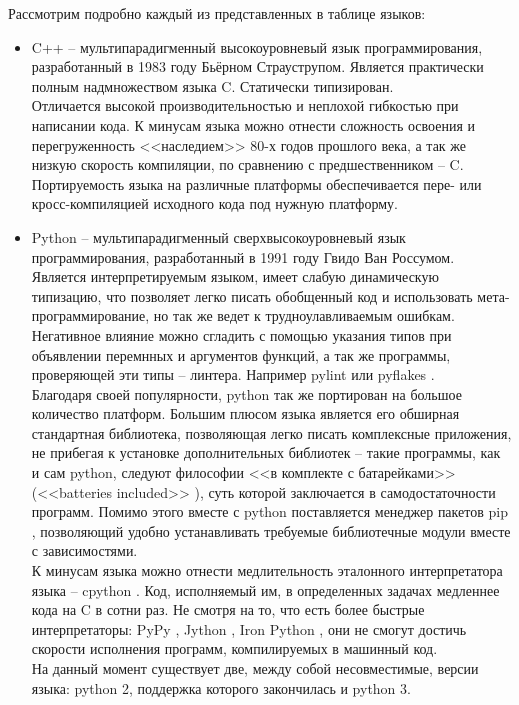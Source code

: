 Рассмотрим подробно каждый из представленных в таблице языков:
\begin{itemize}
    \item C++ -- мультипарадигменный высокоуровневый язык программирования,
        разработанный в 1983 году Бьёрном Страуструпом. Является практически
        полным надмножеством языка C. Статически типизирован.\\
        Отличается высокой производительностью и неплохой гибкостью при написании кода.
        К минусам языка можно отнести сложность освоения и перегруженность 
        <<наследием>> 80-х годов прошлого века, а так же низкую скорость компиляции,
        по сравнению с предшественником -- C.\\
        Портируемость языка на различные платформы обеспечивается пере- или
        кросс-компиляцией исходного кода под нужную платформу.
        

    \item Python \autocite{python} -- мультипарадигменный сверхвысокоуровневый 
        язык программирования, разработанный в 1991 году Гвидо Ван Россумом.
        Является интерпретируемым языком, имеет слабую динамическую типизацию,
        что позволяет легко писать обобщенный код и использовать мета-программирование,
        но так же ведет к трудноулавливаемым ошибкам. Негативное влияние можно сгладить
        с помощью указания типов при объявлении перемнных и аргументов функций, а так же 
        программы, проверяющей эти типы -- линтера. Например pylint \autocite{pylint} или
        pyflakes \autocite{pyflakes}.\\
        Благодаря своей популярности, python так же портирован на большое количество платформ.
        Большим плюсом языка является его обширная стандартная библиотека, позволяющая легко
        писать комплексные приложения, не прибегая к установке дополнительных библиотек --
        такие программы, как и сам python, следуют философии <<в комплекте с батарейками>>
        (<<batteries included>> \autocite{batteries-included}), суть которой заключается в 
        самодостаточности программ. Помимо этого вместе с python поставляется менеджер
        пакетов pip \autocite{pip}, позволяющий удобно устанавливать требуемые библиотечные модули вместе
        с зависимостями.\\
        К минусам языка можно отнести медлительность эталонного интерпретатора языка -- cpython \autocite{cpython}.
        Код, исполняемый им, в определенных задачах медленнее кода на C в сотни раз. Не смотря на то, что
        есть более быстрые интерпретаторы: PyPy \autocite{pypy}, Jython \autocite{jython}, Iron Python \autocite{iron-python},
        они не смогут достичь скорости исполнения программ, компилируемых в машинный код.\\
        На данный момент существует две, между собой несовместимые, версии языка: 
        python 2, поддержка которого закончилась  и python 3.


\end{itemize}
